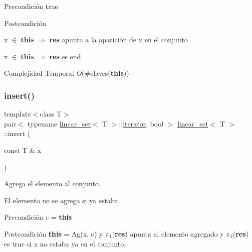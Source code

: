 \begin{DoxyPrecond}{Precondición}
true 
\end{DoxyPrecond}
\begin{DoxyPostcond}{Postcondición}

\begin{DoxyItemize}
\item x $\in$ {\bfseries this} $\Rightarrow$ {\bfseries res} apunta a la aparición de x en el conjunto
\item x $\in$ {\bfseries this} $\Rightarrow$ {\bfseries res} es end
\end{DoxyItemize}
\end{DoxyPostcond}

\begin{DoxyDescription}
\item[Complejidad Temporal]$O$(\#claves({\bfseries this}))
\end{DoxyDescription}\mbox{\label{classlinear__set_a66b2d1323a28dcd2dd7511e4b65f4529}} 
\subsubsection{\texorpdfstring{insert()}{insert()}}
{\footnotesize\ttfamily template$<$class T$>$ \\
pair$<$ typename \mbox{\hyperlink{classlinear__set}{linear\+\_\+set}}$<$ T $>$\+::\mbox{\hyperlink{classlinear__set_1_1iterator}{iterator}}, bool $>$ \mbox{\hyperlink{classlinear__set}{linear\+\_\+set}}$<$ T $>$\+::insert (\begin{DoxyParamCaption}\item[{const T \&}]{x }\end{DoxyParamCaption})}



Agrega el elemento al conjunto. 

El elemento no se agrega si ya estaba.

\begin{DoxyPrecond}{Precondición}
c = {\bfseries this} 
\end{DoxyPrecond}
\begin{DoxyPostcond}{Postcondición}
{\bfseries this} = Ag(x, c) y $\pi_1$({\bfseries res}) apunta al elemento agregado y $\pi_2$({\bfseries res}) es true si x no estaba ya en el conjunto.
\end{DoxyPostcond}

